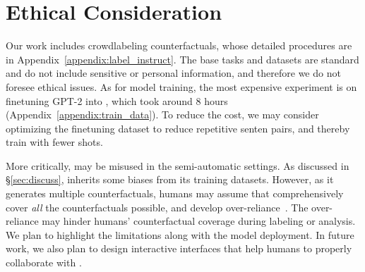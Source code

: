 
\section{Ethical Consideration}

Our work includes crowdlabeling counterfactuals, whose detailed procedures are in Appendix~\ref{appendix:label_instruct}.
The base tasks and datasets are standard and do not include sensitive or personal information, and therefore we do not foresee ethical issues. 
As for model training, the most expensive experiment is on finetuning GPT-2 into \sysname, which took around 8 hours (Appendix~\ref{appendix:train_data}).
To reduce the cost, we may consider optimizing the finetuning dataset to reduce repetitive senten pairs, and thereby train \sysname with fewer shots.

More critically, \sysname may be misused in the semi-automatic settings. 
As discussed in \S\ref{sec:discuss}, \sysname inherits some biases from its training datasets.
However, as it generates multiple counterfactuals, humans may assume that \sysname comprehensively cover \emph{all} the counterfactuals possible, and develop over-reliance~\cite{bansal2021does}.
The over-reliance may hinder humans' counterfactual coverage during labeling or analysis.
We plan to highlight the limitations along with the model deployment. 
In future work, we also plan to design interactive interfaces that help humans to properly collaborate with \sysname.

